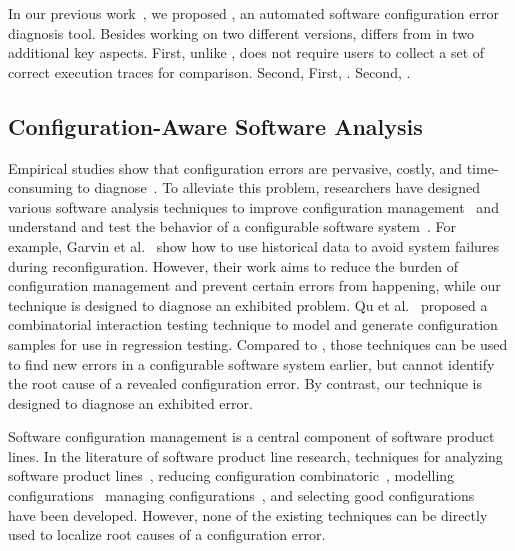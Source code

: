 In our previous work~\cite{}, we proposed \prevtool, an automated
software configuration error diagnosis tool. Besides working
on two different versions, \ourtool differs from \prevtool in
two additional key aspects. First, unlike \prevtool, \ourtool
does not require users to collect a set of correct execution traces
for comparison. Second, 
First, . Second, .




\subsection{Configuration-Aware Software Analysis}

Empirical studies show that configuration errors are pervasive, costly,
and time-consuming to diagnose~\cite{Yin:2011:ESC, Hubaux:2012}.
To alleviate this problem, researchers have designed various
software analysis techniques to improve configuration
management~\cite{Garvin:2011} and understand and test
the behavior of a configurable software
system~\cite{Garvin:2011, Qu:2008:CRT}.
For example, Garvin et al.~\cite{Garvin:2011} show how to
use historical data to avoid system failures during reconfiguration.
However, their work aims to reduce the burden of
configuration management and prevent certain errors from happening,
while our technique is designed to diagnose an exhibited problem.
Qu et al.~\cite{Qu:2008:CRT} proposed a combinatorial interaction
testing technique to model and generate configuration samples for
use in regression testing. Compared to \ourtool, those techniques
can be used to find new errors in
a configurable software system earlier, but cannot
identify the root cause of a revealed configuration error.
 By contrast, our technique is designed
to diagnose an exhibited error.

Software configuration management is a central component
of software product lines. In the literature of software
product line research, techniques for analyzing
software product lines~\cite{Bodden:2013:SLS, Kang:2005:FRL, Mende:2008:SGM, Kruger:2005:SAE}, reducing configuration
combinatoric~\cite{fse-splat, Apel:2009:FLA, Shang:2013:ADB, Staats:2011:PTO}, modelling
configurations~\cite{Denaro:Self-Test:TACOS:2003, Acher:2012:SCF}
managing configurations~\cite{Rabiser:2012:QSU, Cooray:2010:RRD, Barreiros:2009:MRC, TerBeek:2011:GCE},
and selecting good configurations~\cite{reconfig}
have been developed. However, none of the existing techniques
can be directly used to localize root causes of a configuration error.
